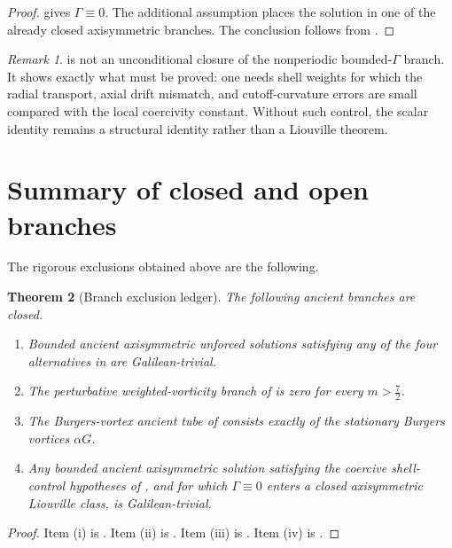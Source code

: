 \documentclass[11pt]{amsart}
\theoremstyle{plain}
\newtheorem{theorem}{Theorem}[section]
\theoremstyle{definition}
\theoremstyle{remark}
\newtheorem{remark}[theorem]{Remark}
\numberwithin{equation}{section}
\begin{document}
\begin{proof}
 gives \(\Gamma\equiv0\).  The additional
assumption places the solution in one of the already closed axisymmetric
branches.  The conclusion follows from .
\end{proof}

\begin{remark}
 is not an unconditional closure of the
nonperiodic bounded-\(\Gamma\) branch.  It shows exactly what must be proved:
one needs shell weights for which the radial transport, axial drift mismatch,
and cutoff-curvature errors are small compared with the local coercivity
constant.  Without such control, the scalar identity remains a structural
identity rather than a Liouville theorem.
\end{remark}

\section{Summary of closed and open branches}

The rigorous exclusions obtained above are the following.

\begin{theorem}[Branch exclusion ledger]\label{thm:ledger}
The following ancient branches are closed.
\begin{enumerate}[label=\textup{(\roman*)}]
\item Bounded ancient axisymmetric unforced solutions satisfying any of the
four alternatives in  are Galilean-trivial.
\item The perturbative weighted-vorticity branch of
 is zero for every \(m>\frac72\).
\item The Burgers-vortex ancient tube of  consists exactly
of the stationary Burgers vortices \(\alpha G\).
\item Any bounded ancient axisymmetric solution satisfying the coercive
shell-control hypotheses of , and for which
\(\Gamma\equiv0\) enters a closed axisymmetric Liouville class, is
Galilean-trivial.
\end{enumerate}
\end{theorem}

\begin{proof}
Item (i) is .  Item (ii) is
.  Item (iii) is .  Item (iv) is
.
\end{proof}
\end{document}

